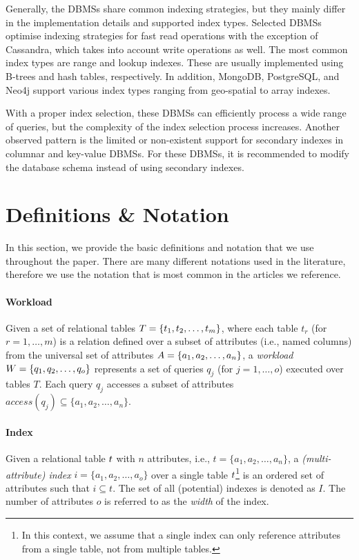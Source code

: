 Generally, the DBMSs share common indexing strategies, but they mainly differ in the implementation details and supported index types. Selected DBMSs optimise indexing strategies for fast read operations with the exception of Cassandra, which takes into account write operations as well. The most common index types are range and lookup indexes. These are usually implemented using B-trees and hash tables, respectively. In addition, MongoDB, PostgreSQL, and Neo4j support various index types ranging from geo-spatial to array indexes.

With a proper index selection, these DBMSs can efficiently process a wide range of queries, but the complexity of the index selection process increases. Another observed pattern is the limited or non-existent support for secondary indexes in columnar and key-value DBMSs. For these DBMSs, it is recommended to modify the database schema instead of using secondary indexes.

\section{Definitions \& Notation}

In this section, we provide the basic definitions and notation that we use throughout the paper. There are many different notations used in the literature, therefore we use the notation that is most common in the articles we reference.

\paragraph{Workload} Given a set of relational tables $T = \{t_1, t_2, \dots, t_m\}$, where each table $t_r$ (for $r = 1, \dots, m$) is a relation defined over a subset of attributes (i.e., named columns) from the universal set of attributes $A = \{a_1, a_2, \dots, a_n\}$, a \textit{workload} $W = \{ q_1, q_2, \dots, q_o \}$ represents a set of queries $q_j$ (for $j = 1, \dots, o$) executed over tables $T$. Each query $q_j$ accesses a subset of attributes $access(q_j) \subseteq \{ a_1, a_2, \dots, a_n \}$.


\paragraph{Index} Given a relational table $t$ with $n$ attributes, i.e., $t = \{ a_1, a_2, \dots, a_n \}$, a \textit{(multi-attribute) index} $i = \{ a_1, a_2, \dots, a_o \}$ over a single table $t$\footnote{In this context, we assume that a single index can only reference attributes from a single table, not from multiple tables.} is an ordered set of attributes such that $i \subseteq t$. The set of all (potential) indexes is denoted as $I$. The number of attributes $o$ is referred to as the \textit{width} of the index.

